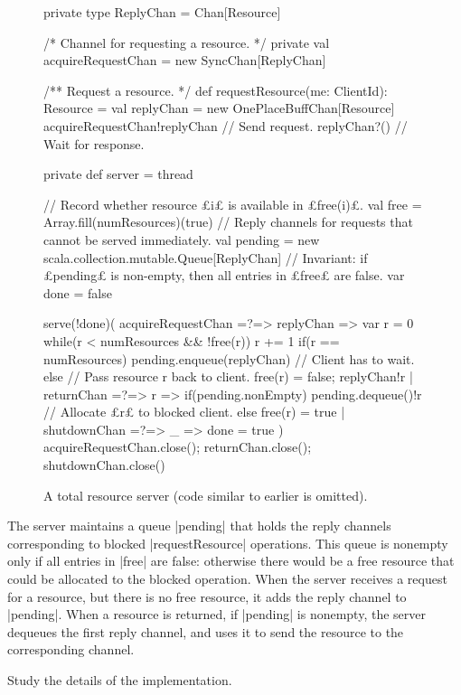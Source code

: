 \begin{figure}
\begin{scala}
  private type ReplyChan = Chan[Resource]

  /* Channel for requesting a resource. */
  private val acquireRequestChan = new SyncChan[ReplyChan]

  /** Request a resource. */
  def requestResource(me: ClientId): Resource = {
    val replyChan = new OnePlaceBuffChan[Resource]
    acquireRequestChan!replyChan  // Send request.
    replyChan?() // Wait for response.
  }

  private def server = thread{
    // Record whether resource £i£ is available in £free(i)£.
    val free = Array.fill(numResources)(true)
    // Reply channels for requests that cannot be served immediately.
    val pending = new scala.collection.mutable.Queue[ReplyChan]
    // Invariant: if £pending£ is non-empty, then all entries in £free£ are false.
    var done = false

    serve(!done)(
      acquireRequestChan =?=> { replyChan =>
	var r = 0
	while(r < numResources && !free(r)) r += 1
	if(r == numResources) 
          pending.enqueue(replyChan) // Client has to wait.
        else{  // Pass resource r back to client. 
	  free(r) = false; replyChan!r
        }
      }
      | returnChan =?=> { r =>
          if(pending.nonEmpty)
            pending.dequeue()!r // Allocate £r£ to blocked client.
          else free(r) = true
      }
      | shutdownChan =?=> { _ => done = true }
    )
    acquireRequestChan.close(); returnChan.close(); shutdownChan.close()
  }
\end{scala}
\caption{A total resource server (code similar to earlier is omitted).}
\label{fig:totalRAServer}
\end{figure}

The server maintains a queue |pending| that holds the reply channels
corresponding to blocked |requestResource| operations.  This queue is nonempty
only if all entries in |free| are false: otherwise there would be a free
resource that could be allocated to the blocked operation.  When the server
receives a request for a resource, but there is no free resource, it adds the
reply channel to |pending|.  When a resource is returned, if |pending| is
nonempty, the server dequeues the first reply channel, and uses it to send the
resource to the corresponding channel.

\begin{instruction}
Study the details of the implementation.
\end{instruction}

